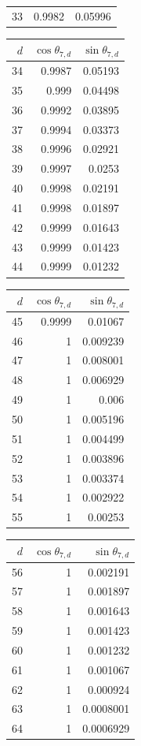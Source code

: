 {\begin{tabular}[t]{r|rr}
33 & 0.9982 & 0.05996
\end{tabular}\kern4pt
\begin{tabular}[t]{r|rr}
$d$ & $\cos\theta_{7,d}$ & $\sin\theta_{7,d}$ \\\hline
34 & 0.9987 & 0.05193 \\
35 & 0.999 & 0.04498 \\
36 & 0.9992 & 0.03895 \\
37 & 0.9994 & 0.03373 \\
38 & 0.9996 & 0.02921 \\
39 & 0.9997 & 0.0253 \\
40 & 0.9998 & 0.02191 \\
41 & 0.9998 & 0.01897 \\
42 & 0.9999 & 0.01643 \\
43 & 0.9999 & 0.01423 \\
44 & 0.9999 & 0.01232
\end{tabular}\kern4pt
\begin{tabular}[t]{r|rr}
$d$ & $\cos\theta_{7,d}$ & $\sin\theta_{7,d}$ \\\hline
45 & 0.9999 & 0.01067 \\
46 & 1 & 0.009239 \\
47 & 1 & 0.008001 \\
48 & 1 & 0.006929 \\
49 & 1 & 0.006 \\
50 & 1 & 0.005196 \\
51 & 1 & 0.004499 \\
52 & 1 & 0.003896 \\
53 & 1 & 0.003374 \\
54 & 1 & 0.002922 \\
55 & 1 & 0.00253
\end{tabular}\kern4pt
\begin{tabular}[t]{r|rr}
$d$ & $\cos\theta_{7,d}$ & $\sin\theta_{7,d}$ \\\hline
56 & 1 & 0.002191 \\
57 & 1 & 0.001897 \\
58 & 1 & 0.001643 \\
59 & 1 & 0.001423 \\
60 & 1 & 0.001232 \\
61 & 1 & 0.001067 \\
62 & 1 & 0.000924 \\
63 & 1 & 0.0008001 \\
64 & 1 & 0.0006929
\end{tabular}}


